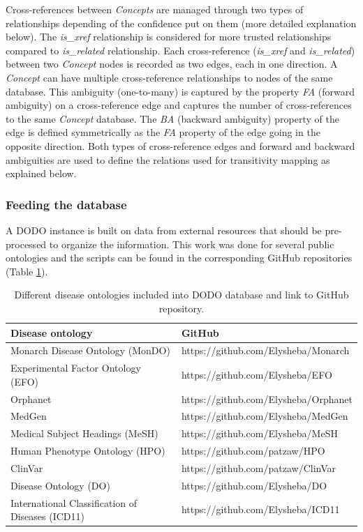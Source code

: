 \documentclass[9pt,a4paper,]{extarticle}
\begin{document}
Cross-references between \emph{Concepts} are managed through two types of relationships depending of the confidence put on them (more detailed explanation below). The \emph{is\_xref} relationship is considered for more trusted relationships compared to \emph{is\_related} relationship. Each cross-reference (\emph{is\_xref} and \emph{is\_related}) between two \emph{Concept} nodes is recorded as two edges, each in one direction. A \emph{Concept} can have multiple cross-reference relationships to nodes of the same database. This ambiguity (one-to-many) is captured by the property \emph{FA} (forward ambiguity) on a cross-reference edge and captures the number of cross-references to the same \emph{Concept} database. The \emph{BA} (backward ambiguity) property of the edge is defined symmetrically as the \emph{FA} property of the edge going in the opposite direction. Both types of cross-reference edges and forward and backward ambiguities are used to define the relations used for transitivity mapping as explained below.

\hypertarget{feeding-the-database}{%
\subsubsection{Feeding the database}\label{feeding-the-database}}

A DODO instance is built on data from external resources that should be pre-processed to organize the information. This work was done for several public ontologies and the scripts can be found in the corresponding GitHub repositories (Table \ref{tab:githubOntology}).

\begin{table}

\caption{\label{tab:githubOntology}Different disease ontologies included into DODO database and link to GitHub repository.}
\centering
\begin{tabular}[t]{ll}
\toprule
Disease ontology & GitHub\\
\midrule
Monarch Disease Ontology (MonDO) & https://github.com/Elysheba/Monarch\\
Experimental Factor Ontology (EFO) & https://github.com/Elysheba/EFO\\
Orphanet & https://github.com/Elysheba/Orphanet\\
MedGen & https://github.com/Elysheba/MedGen\\
Medical Subject Headings (MeSH) & https://github.com/Elysheba/MeSH\\
\addlinespace
Human Phenotype Ontology (HPO) & https://github.com/patzaw/HPO\\
ClinVar & https://github.com/patzaw/ClinVar\\
Disease Ontology (DO) & https://github.com/Elysheba/DO\\
International Classification of Diseases (ICD11) & https://github.com/Elysheba/ICD11\\
\bottomrule
\end{tabular}
\end{table}
\end{document}
